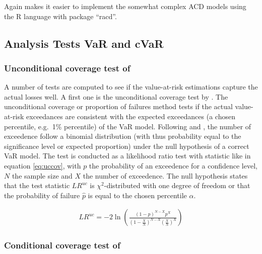 \documentclass[a4paper, twoside]{templates/ociamthesis}
\begin{document}
Again \textcite{ghalanos2016} makes it easier to implement the somewhat complex ACD models using the R language with package ``racd''.

\hypertarget{analysis-tests-var-and-cvar}{%
\subsection{Analysis Tests VaR and cVaR}\label{analysis-tests-var-and-cvar}}

\hypertarget{unconditional-coverage-test-of-kupiec1995}{%
\subsubsection{\texorpdfstring{Unconditional coverage test of \textcite{kupiec1995}}{Unconditional coverage test of @kupiec1995}}\label{unconditional-coverage-test-of-kupiec1995}}

\noindent A number of tests are computed to see if the value-at-risk estimations capture the actual losses well. A first one is the unconditional coverage test by \textcite{kupiec1995}. The unconditional coverage or proportion of failures method tests if the actual value-at-risk exceedances are consistent with the expected exceedances (a chosen percentile, e.g.~1\% percentile) of the VaR model. Following \textcite{kupiec1995} and \textcite{ghalanos2020}, the number of exceedence follow a binomial distribution (with thus probability equal to the significance level or expected proportion) under the null hypothesis of a correct VaR model. The test is conducted as a likelihood ratio test with statistic like in equation \eqref{eq:uccov}, with \(p\) the probability of an exceedence for a confidence level, \(N\) the sample size and \(X\) the number of exceedence. The null hypothesis states that the test statistic \(L R^{u c}\) is \(\chi^2\)-distributed with one degree of freedom or that the probability of failure \(\hat p\) is equal to the chosen percentile \(\alpha\).

\begin{align}
L R^{u c}=-2 \ln \left(\frac{(1-p)^{N-X} p^{X}}{\left(1-\frac{X}{N}\right)^{N-X}\left(\frac{X}{N}\right)^{X}}\right)
\label{eq:uccov}
\end{align}

\hypertarget{conditional-coverage-test-of-christoffersen2001}{%
\subsubsection{\texorpdfstring{Conditional coverage test of \textcite{christoffersen2001}}{Conditional coverage test of @christoffersen2001}}\label{conditional-coverage-test-of-christoffersen2001}}
\end{document}
